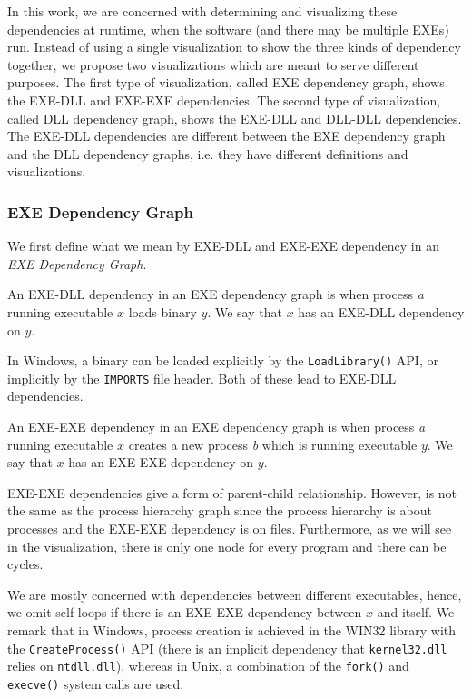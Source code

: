 In this work, we are concerned with determining and visualizing these
dependencies at runtime, when the software (and there may be multiple
EXEs) run.
Instead of using a single visualization to show the three kinds of dependency
together, we propose two visualizations which are meant
to serve different purposes.
The first type of visualization, called EXE dependency graph,
shows the EXE-DLL and EXE-EXE dependencies.
The second type of visualization, called DLL dependency graph,
shows the EXE-DLL and DLL-DLL dependencies.
The EXE-DLL dependencies are different between the EXE dependency
graph and the DLL dependency graphs, i.e. they have different definitions
and visualizations.

\subsubsection{EXE Dependency Graph}
\label{sec:exe-dep-graph}

We first define what we mean by EXE-DLL and EXE-EXE dependency in
an {\em EXE Dependency Graph}.

\begin{definition}
An EXE-DLL dependency in an EXE dependency graph
is when process {\em a} running executable
$x$ loads binary $y$.
We say that $x$ has an EXE-DLL dependency on $y$.
\end{definition}
In Windows, a binary can be loaded explicitly by the {\tt LoadLibrary()} API,
or implicitly by the {\tt IMPORTS} file header.
Both of these lead to EXE-DLL dependencies.

\begin{definition}
An EXE-EXE dependency in an EXE dependency graph
is when process {\em a} running executable $x$ creates
a new process {\em b} which is running executable $y$.
We say that $x$ has an EXE-EXE dependency on $y$.
\end{definition}

EXE-EXE dependencies give a form of parent-child relationship.
However, is not the same as the process hierarchy graph
since the process hierarchy is about processes and the EXE-EXE
dependency is on files.
Furthermore, as we will see in the visualization,
there is only one node for every program and there can be cycles.

We are mostly concerned with dependencies between different executables,
hence, we omit self-loops if there is an EXE-EXE dependency between $x$ and
itself.
We remark that in Windows, process creation is achieved in the WIN32 library
with the {\tt CreateProcess()} API (there
is an implicit dependency that {\tt kernel32.dll} relies on {\tt ntdll.dll}),
where\-as in Unix, a combination of the
{\tt fork()} and {\tt execve()} system calls
are used.

